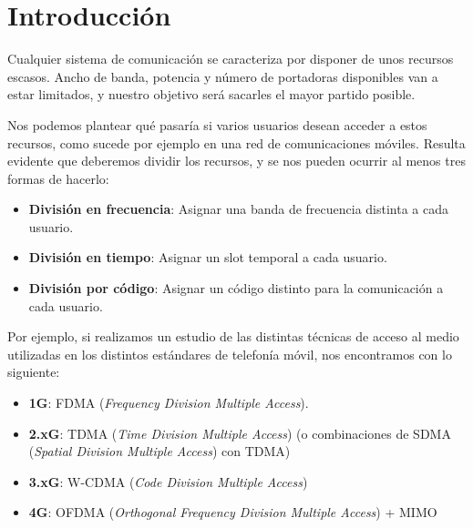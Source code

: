 \documentclass[es,apuntes]{uah}
\begin{document}

\maketitle


\section{Introducción}

Cualquier sistema de comunicación se caracteriza por disponer de unos recursos escasos. Ancho de banda, potencia y número de portadoras disponibles van a estar limitados, y nuestro objetivo será sacarles el mayor partido posible.

Nos podemos plantear qué pasaría si varios usuarios desean acceder a estos recursos, como sucede por ejemplo en una red de comunicaciones móviles. Resulta evidente que deberemos dividir los recursos, y se nos pueden ocurrir al menos tres formas de hacerlo:

\begin{itemize}
	\item {\bf División en frecuencia}: Asignar una banda de frecuencia distinta a cada usuario.
	\item {\bf División en tiempo}: Asignar un slot temporal a cada usuario.
	\item {\bf División por código}: Asignar un código distinto para la comunicación a cada usuario. 
\end{itemize}

Por ejemplo, si realizamos un estudio de las distintas técnicas de acceso al medio utilizadas en los distintos estándares de telefonía móvil, nos encontramos con lo siguiente:

\begin{itemize}
	\item {\bf 1G}: FDMA (\textit{Frequency Division Multiple Access}).
	\item {\bf 2.xG}: TDMA (\textit{Time Division Multiple Access}) (o combinaciones de SDMA (\textit{Spatial Division Multiple Access}) con TDMA)
	\item {\bf 3.xG}: W-CDMA (\textit{Code Division Multiple Access})
	\item {\bf 4G}: OFDMA (\textit{Orthogonal Frequency Division Multiple Access}) + MIMO 
\end{itemize}
\end{document}
